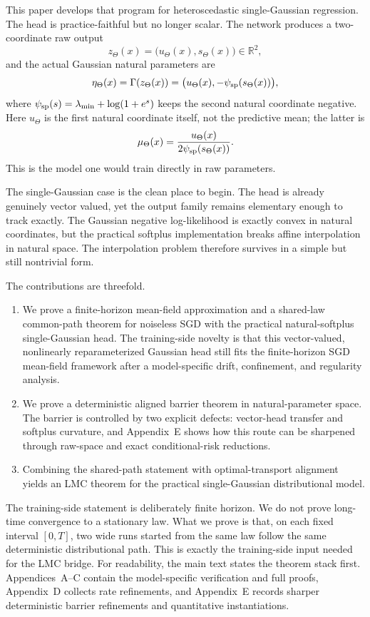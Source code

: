 \documentclass[11pt]{article}
\theoremstyle{definition}
\newcommand{\R}{\mathbb{R}}
\begin{document}
This paper develops that program for heteroscedastic single-Gaussian
regression. The head is practice-faithful but no longer scalar. The network
produces a two-coordinate raw output
\[
  z_\Theta(x)=\bigl(u_\Theta(x),s_\Theta(x)\bigr)\in\R^2,
\]
and the actual Gaussian natural parameters are
\[
  \eta_\Theta(x)=\Gamma(z_\Theta(x))
  =
  \bigl(u_\Theta(x),-\psi_{\rm sp}(s_\Theta(x))\bigr),
\]
where $\psi_{\rm sp}(s)=\lambda_{\min}+\log(1+e^s)$ keeps the second natural
coordinate negative. Here $u_\Theta$ is the first natural coordinate itself,
not the predictive mean; the latter is
\[
  \mu_\Theta(x)=\frac{u_\Theta(x)}{2\psi_{\rm sp}(s_\Theta(x))}.
\]
This is the model one would train directly in raw parameters.

The single-Gaussian case is the clean place to begin. The head is already
genuinely vector valued, yet the output family remains elementary enough to
track exactly. The Gaussian negative log-likelihood is exactly convex in
natural coordinates, but the practical softplus implementation breaks affine
interpolation in natural space. The interpolation problem therefore survives in
a simple but still nontrivial form.

The contributions are threefold.
\begin{enumerate}[label=(C\arabic*)]
  \item We prove a finite-horizon mean-field approximation and a shared-law
  common-path theorem for noiseless SGD with the practical natural-softplus
  single-Gaussian head. The training-side novelty is that this vector-valued,
  nonlinearly reparameterized Gaussian head still fits the finite-horizon SGD
  mean-field framework after a model-specific drift, confinement, and
  regularity analysis.
  \item We prove a deterministic aligned barrier theorem in natural-parameter
  space. The barrier is controlled by two explicit defects: vector-head
  transfer and softplus curvature, and Appendix~E shows how this route can be
  sharpened through raw-space and exact conditional-risk reductions.
  \item Combining the shared-path statement with optimal-transport alignment
  yields an LMC theorem for the practical single-Gaussian distributional model.
\end{enumerate}

The training-side statement is deliberately finite horizon. We do not prove
long-time convergence to a stationary law. What we prove is that, on each fixed
interval $[0,T]$, two wide runs started from the same law follow the same
deterministic distributional path. This is exactly the training-side input
needed for the LMC bridge. For readability, the main text states the theorem
stack first. Appendices~A--C contain the model-specific verification and full
proofs, Appendix~D collects rate refinements, and Appendix~E records sharper
deterministic barrier refinements and quantitative instantiations.
\end{document}
